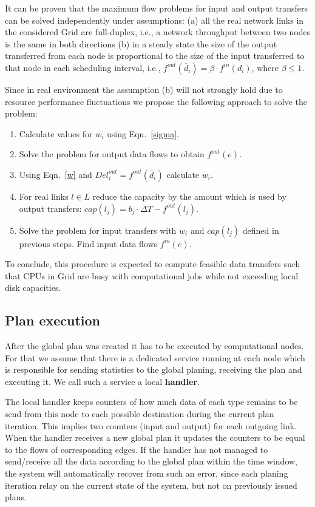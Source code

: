 \documentclass{svjour3}                     %
\begin{document}
It can be proven that the maximum flow problems for input and output transfers
can be solved independently under assumptions: (a) all the real network links
in the considered Grid are full-duplex, i.e., a network throughput between two
nodes is the same in both directions (b) in a steady state the size of the
output transferred from each node is proportional to the size of the input
transferred to that node in each scheduling interval, i.e.,
$f^{out}(\overline{d}_{i})= \beta \cdot f^{in}(d_{i})$, where $\beta \leq 1$.

Since in real environment the assumption (b) will not strongly hold due to
resource performance fluctuations we propose the following approach to
solve the problem:
%
\begin{enumerate}
\item Calculate values for $\overline{w}_{i}$ using Eqn.~\ref{sigma}.
\item Solve the problem for output data flows to obtain $f^{out}(e)$.
\item Using Eqn.~\ref{w} and $Del_{i}^{out} = f^{out}(\overline{d}_{i})$ calculate $w_{i}$.
\item For real links $l \in L$ reduce the capacity by the amount which is used by output transfers: $cap(l_{j}) = b_{j} \cdot \Delta T - f^{out}(l_{j})$.
\item Solve the problem for input transfers with $w_{i}$ and $cap(l_{j})$ defined in previous steps. Find input data flows $f^{in}(e)$.
\end{enumerate}
%
To conclude, this procedure is expected to compute feasible data transfers 
such that CPUs in Grid are busy with computational jobs while not exceeding 
local disk capacities.

\subsection{Plan execution}
\label{plan-execution}
After the global plan was created it has to be executed by computational
nodes. For that we assume that there is a dedicated service running at each node
which is responsible for sending statistics to the global planing, receiving the plan and executing it. We call such a service a local \textbf{ handler}. 

The local handler keeps counters of how much data of each type remains to be send from this node to each  possible destination during the current plan iteration. This implies two counters (input and output) for each outgoing link. When the handler receives a new global plan it updates the counters to be equal to the flows of corresponding edges. If the handler has not managed to send/receive all the data according to the global plan within the time window, the system will automatically recover from such an error, since each planing iteration relay on the current state of the system, but not on previously issued plans.  
\end{document}
